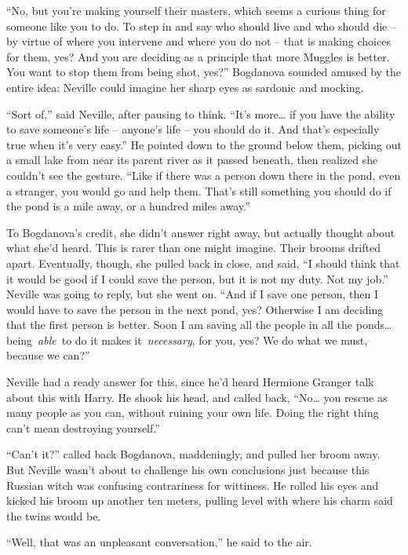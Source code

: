 ``No, but you're making yourself their masters, which seems a curious
thing for someone like you to do. To step in and say who should live and
who should die -- by virtue of where you intervene and where you do not
-- that is making choices for them, yes? And you are deciding as a
principle that more Muggles is better. You want to stop them from being
shot, yes?'' Bogdanova sounded amused by the entire idea: Neville could
imagine her sharp eyes as sardonic and mocking.

``Sort of,'' said Neville, after pausing to think. ``It's more\ldots{}
if you have the ability to save someone's life -- anyone's life -- you
should do it. And that's especially true when it's very easy.'' He
pointed down to the ground below them, picking out a small lake from
near its parent river as it passed beneath, then realized she couldn't
see the gesture. ``Like if there was a person down there in the pond,
even a stranger, you would go and help them. That's still something you
should do if the pond is a mile away, or a hundred miles away.''

To Bogdanova's credit, she didn't answer right away, but actually
thought about what she'd heard. This is rarer than one might imagine.
Their brooms drifted apart. Eventually, though, she pulled back in
close, and said, ``I should think that it would be good if I could save
the person, but it is not my duty. Not my job.'' Neville was going to
reply, but she went on. ``And if I save one person, then I would have to
save the person in the next pond, yes? Otherwise I am deciding that the
first person is better. Soon I am saving all the people in all the
ponds\ldots{} being~\emph{able}~to do it makes it~\emph{necessary}, for
you, yes? We do what we must, because we can?''

Neville had a ready answer for this, since he'd heard Hermione Granger
talk about this with Harry. He shook his head, and called back,
``No\ldots{} you rescue as many people as you can, without ruining your
own life. Doing the right thing can't mean destroying yourself.''

``Can't it?'' called back Bogdanova, maddeningly, and pulled her broom
away. But Neville wasn't about to challenge his own conclusions just
because this Russian witch was confusing contrariness for wittiness. He
rolled his eyes and kicked his broom up another ten meters, pulling
level with where his charm said the twins would be.

``Well, that was an unpleasant conversation,'' he said to the air.

